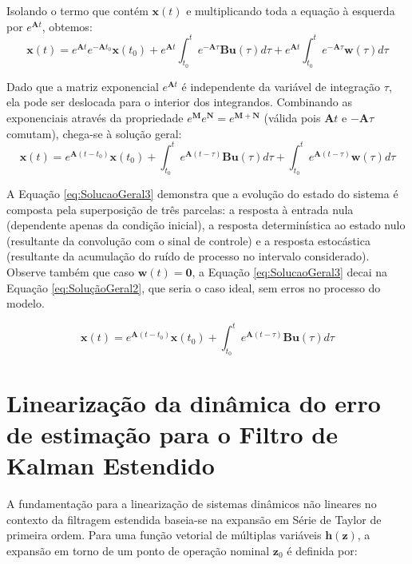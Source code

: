 \documentclass[a4paper,12pt]{article}
\begin{document}
Isolando o termo que contém $\mathbf{x}(t)$ e multiplicando toda a equação à esquerda por $e^{\mathbf{A}t}$, obtemos:
\begin{equation}
    \mathbf{x}(t) = e^{\mathbf{A}t} e^{-\mathbf{A}t_0} \mathbf{x}(t_0) + e^{\mathbf{A}t} \int_{t_0}^t e^{-\mathbf{A}\tau} \mathbf{B}\mathbf{u}(\tau) d\tau + e^{\mathbf{A}t} \int_{t_0}^t e^{-\mathbf{A}\tau} \mathbf{w}(\tau) d\tau
\end{equation}

Dado que a matriz exponencial $e^{\mathbf{A}t}$ é independente da variável de integração $\tau$, ela pode ser deslocada para o interior dos integrandos. Combinando as exponenciais através da propriedade $e^{\mathbf{M}}e^{\mathbf{N}} = e^{\mathbf{M+N}}$ (válida pois $\mathbf{A}t$ e $-\mathbf{A}\tau$ comutam), chega-se à solução geral:
\begin{equation}
    \mathbf{x}(t) = e^{\mathbf{A}(t-t_0)}\mathbf{x}(t_0) + \int_{t_0}^t e^{\mathbf{A}(t-\tau)} \mathbf{B}\mathbf{u}(\tau) d\tau + \int_{t_0}^t e^{\mathbf{A}(t-\tau)} \mathbf{w}(\tau) d\tau
    \label{eq:SolucaoGeral3}
\end{equation}


A Equação \eqref{eq:SolucaoGeral3} demonstra que a evolução do estado do sistema é composta pela superposição de três parcelas: a resposta à entrada nula (dependente apenas da condição inicial), a resposta determinística ao estado nulo (resultante da convolução com o sinal de controle) e a resposta estocástica (resultante da acumulação do ruído de processo no intervalo considerado). Observe também que caso $\mathbf{w}(t) = \mathbf{0}$, a Equação \ref{eq:SolucaoGeral3} decai na Equação \ref{eq:SoluçãoGeral2}, que seria o caso ideal, sem erros no processo do modelo.

\begin{equation}
    \mathbf{x}(t) = e^{\mathbf{A}(t-t_0)}\mathbf{x}(t_0) + \int_{t_0}^t e^{\mathbf{A}(t-\tau)} \mathbf{B}\mathbf{u}(\tau) d\tau
    \label{eq:SoluçãoGeral2}
\end{equation}

\section{Linearização da dinâmica do erro de estimação para o Filtro de Kalman Estendido}
\label{anm:solucao_edo_geral}

A fundamentação para a linearização de sistemas dinâmicos não lineares no contexto da filtragem estendida baseia-se na expansão em Série de Taylor de primeira ordem. Para uma função vetorial de múltiplas variáveis $\mathbf{h}(\mathbf{z})$, a expansão em torno de um ponto de operação nominal $\mathbf{z}_0$ é definida por:
\end{document}

